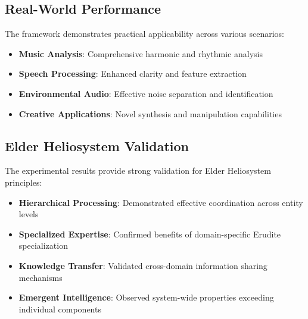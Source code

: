 \subsection{Real-World Performance}

The framework demonstrates practical applicability across various scenarios:

\begin{itemize}
    \item \textbf{Music Analysis}: Comprehensive harmonic and rhythmic analysis
    \item \textbf{Speech Processing}: Enhanced clarity and feature extraction
    \item \textbf{Environmental Audio}: Effective noise separation and identification
    \item \textbf{Creative Applications}: Novel synthesis and manipulation capabilities
\end{itemize}

\subsection{Elder Heliosystem Validation}

The experimental results provide strong validation for Elder Heliosystem principles:

\begin{itemize}
    \item \textbf{Hierarchical Processing}: Demonstrated effective coordination across entity levels
    \item \textbf{Specialized Expertise}: Confirmed benefits of domain-specific Erudite specialization
    \item \textbf{Knowledge Transfer}: Validated cross-domain information sharing mechanisms
    \item \textbf{Emergent Intelligence}: Observed system-wide properties exceeding individual components
\end{itemize}